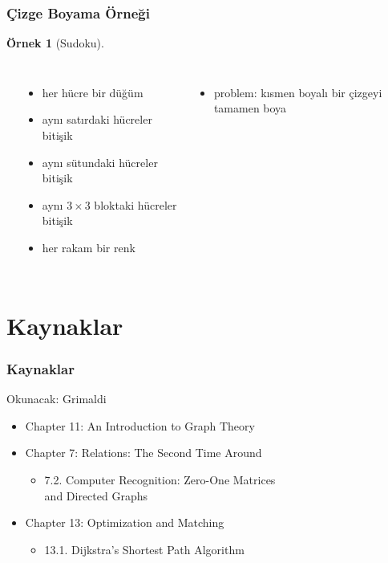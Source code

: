 \documentclass[dvipsnames]{beamer}
\theoremstyle{definition}
\theoremstyle{example}
\newtheorem{ornek}[theorem]{Örnek}
\theoremstyle{plain}
\begin{document}
\begin{frame}
  \frametitle{Çizge Boyama Örneği}

  \begin{ornek}[Sudoku]
    \begin{columns}[t]
      \begin{center}
      \end{center}

      \begin{itemize}
        \item her hücre bir düğüm
        \item aynı satırdaki hücreler bitişik
        \item aynı sütundaki hücreler bitişik
        \item aynı $3 \times 3$ bloktaki hücreler bitişik
        \item her rakam bir renk
      \end{itemize}

      \pause
      \begin{itemize}
        \item problem: kısmen boyalı bir çizgeyi tamamen boya
      \end{itemize}
    \end{columns}
  \end{ornek}
\end{frame}

\section*{Kaynaklar}

\begin{frame}
  \frametitle{Kaynaklar}

  \begin{block}{Okunacak: Grimaldi}
    \begin{itemize}
      \item Chapter 11: \alert{An Introduction to Graph Theory}

      \item Chapter 7: Relations: The Second Time Around
      \begin{itemize}
        \item 7.2. \alert{Computer Recognition: Zero-One Matrices\\
                          and Directed Graphs}
      \end{itemize}

      \item Chapter 13: Optimization and Matching
      \begin{itemize}
        \item 13.1. \alert{Dijkstra's Shortest Path Algorithm}
      \end{itemize}
    \end{itemize}
  \end{block}
\end{frame}
\end{document}
